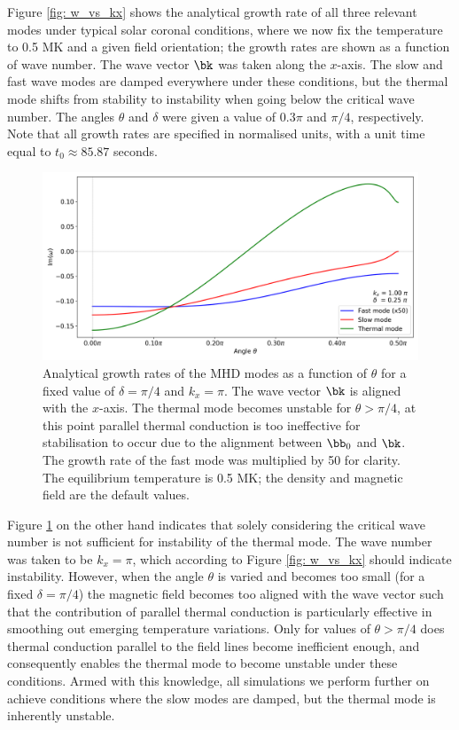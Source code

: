 Figure \ref{fig: w_vs_kx} shows the analytical growth rate of all three relevant modes under typical solar coronal conditions, where we now fix the temperature to 0.5 MK and a given field orientation; the growth rates are shown as a function of wave number. The wave vector $\bk$ was taken along the $x$-axis. The slow and fast wave modes are damped everywhere under these conditions, but the thermal mode shifts from stability to instability when going below the critical wave number. The angles $\theta$ and $\delta$ were given a value of $0.3\pi$ and $\pi/4$, respectively. Note that all growth rates are specified in normalised units, with a unit time equal to $t_0 \approx 85.87$ seconds.

\begin{figure}[t]
  \centering
  \includegraphics[width=\textwidth]{w_vs_theta.png}
  \caption{
    Analytical growth rates of the MHD modes as a function of $\theta$ for a fixed value of $\delta = \pi/4$ and $k_x = \pi$. The wave vector $\bk$ is aligned with the $x$-axis. The thermal mode becomes unstable for $\theta > \pi/4$, at this point parallel thermal conduction is too ineffective for stabilisation to occur due to the alignment between $\bb_0$ and $\bk$. The growth rate of the fast mode was multiplied by 50 for clarity. The equilibrium temperature is 0.5 MK; the density and magnetic field are the default values.
  }
  \label{fig: w_vs_theta}
\end{figure}

Figure \ref{fig: w_vs_theta} on the other hand indicates that solely considering the critical wave number is not sufficient for instability of the thermal mode. The wave number was taken to be $k_x = \pi$, which according to Figure \ref{fig: w_vs_kx} should indicate instability. However, when the angle $\theta$ is varied and becomes too small (for a fixed $\delta = \pi/4$) the magnetic field becomes too aligned with the wave vector such that the contribution of parallel thermal conduction is particularly effective in smoothing out emerging temperature variations. Only for values of $\theta > \pi/4$ does thermal conduction parallel to the field lines become inefficient enough, and consequently enables the thermal mode to become unstable under these conditions. Armed with this knowledge, all simulations we perform further on achieve conditions where the slow modes are damped, but the thermal mode is inherently unstable.


